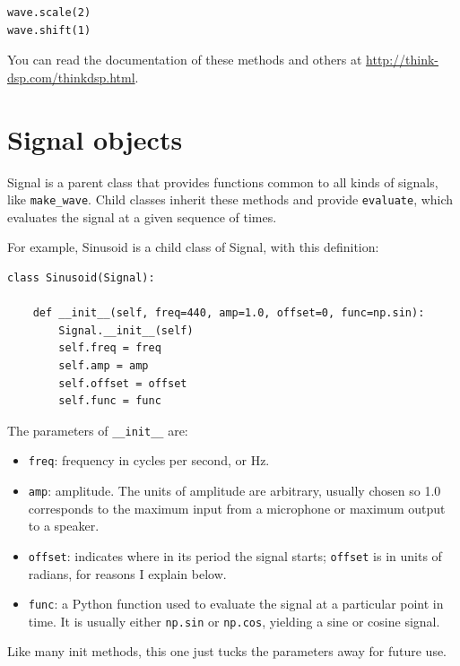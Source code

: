 \documentclass[12pt]{book}
\begin{document}
\begin{verbatim}
wave.scale(2)
wave.shift(1)
\end{verbatim} 

You can read the documentation of these methods and others at
\url{http://think-dsp.com/thinkdsp.html}.


\section{Signal objects}
\label{sigobs}

Signal is a parent class that provides functions common to all
kinds of signals, like \verb"make_wave".  Child classes inherit
these methods and provide {\tt evaluate}, which evaluates the
signal at a given sequence of times.

For example, Sinusoid is a child class of Signal, with this
definition:

\begin{verbatim}
class Sinusoid(Signal):
    
    def __init__(self, freq=440, amp=1.0, offset=0, func=np.sin):
        Signal.__init__(self)
        self.freq = freq
        self.amp = amp
        self.offset = offset
        self.func = func
\end{verbatim}

The parameters of \verb"__init__" are:

\begin{itemize}

\item {\tt freq}: frequency in cycles per second, or Hz.

\item {\tt amp}: amplitude.  The units of amplitude are arbitrary,
usually chosen so 1.0 corresponds to the maximum input from a
microphone or maximum output to a speaker.

\item {\tt offset}: indicates where in its period the signal starts;
{\tt offset} is in units of radians, for reasons I explain below.

\item {\tt func}: a Python function used
to evaluate the signal at a particular point in time.  It is
usually either {\tt np.sin} or {\tt np.cos}, yielding a sine or
cosine signal.

\end{itemize}

Like many init methods, this one just tucks the parameters away for
future use.
\end{document}
